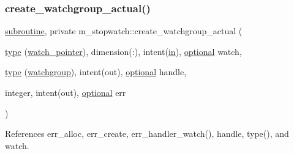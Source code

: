 \subsubsection{\texorpdfstring{create\+\_\+watchgroup\+\_\+actual()}{create\_watchgroup\_actual()}}
{\footnotesize\ttfamily \hyperlink{M__stopwatch_83_8txt_acfbcff50169d691ff02d4a123ed70482}{subroutine}, private m\+\_\+stopwatch\+::create\+\_\+watchgroup\+\_\+actual (\begin{DoxyParamCaption}\item[{\hyperlink{stop__watch_83_8txt_a70f0ead91c32e25323c03265aa302c1c}{type} (\hyperlink{structm__stopwatch_1_1watch__pointer}{watch\+\_\+pointer}), dimension(\+:), intent(\hyperlink{M__journal_83_8txt_afce72651d1eed785a2132bee863b2f38}{in}), \hyperlink{option__stopwatch_83_8txt_aa4ece75e7acf58a4843f70fe18c3ade5}{optional}}]{watch,  }\item[{\hyperlink{stop__watch_83_8txt_a70f0ead91c32e25323c03265aa302c1c}{type} (\hyperlink{structm__stopwatch_1_1watchgroup}{watchgroup}), intent(out), \hyperlink{option__stopwatch_83_8txt_aa4ece75e7acf58a4843f70fe18c3ade5}{optional}}]{handle,  }\item[{integer, intent(out), \hyperlink{option__stopwatch_83_8txt_aa4ece75e7acf58a4843f70fe18c3ade5}{optional}}]{err }\end{DoxyParamCaption})\hspace{0.3cm}{\ttfamily [private]}}



References err\+\_\+alloc, err\+\_\+create, err\+\_\+handler\+\_\+watch(), handle, type(), and watch.

